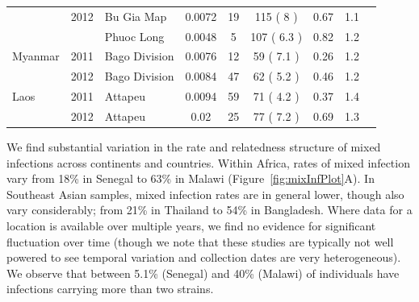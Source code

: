 \documentclass[9pt,lineno]{elife}
\begin{document}
\begin{table}[btp]
{\begin{tabular}{p{1.3cm} c p{1.8cm} c | c c c c p{2.7cm}}
         & 2012 & Bu Gia Map & 0.0072 & 19 & 115 ( 8 )& 0.67 & 1.1&\\
         &      & Phuoc Long & 0.0048 & 5 & 107 ( 6.3 )& 0.82 & 1.2&\\
\cline{1-8}
Myanmar & 2011 & Bago Division & 0.0076 & 12 & 59 ( 7.1 )& 0.26 & 1.2 &\\
        & 2012 & Bago Division & 0.0084 & 47 & 62 ( 5.2 )& 0.46 & 1.2 &\\
\cline{1-8}
Laos & 2011 & Attapeu & 0.0094 & 59 & 71 ( 4.2 )& 0.37 & 1.4 &\\
     & 2012 & Attapeu & 0.02 & 25 & 77 ( 7.2 )& 0.69 & 1.3 &\\
\hline
\bottomrule
\end{tabular}
}

\end{table}



We find substantial variation in the rate and relatedness structure of mixed infections across continents and countries.  Within Africa, rates of mixed infection vary from 18\% in Senegal to 63\% in Malawi (Figure~\ref{fig:mixInfPlot}A). In Southeast Asian samples, mixed infection rates are in general lower, though also vary considerably; from 21\% in Thailand to 54\% in Bangladesh.  Where data for a location is available over multiple years, we find no evidence for significant fluctuation over time (though we note that these studies are typically not well powered to see temporal variation and collection dates are very heterogeneous). We observe that between 5.1\% (Senegal) and 40\% (Malawi) of individuals have infections carrying more than two strains.
\end{document}
